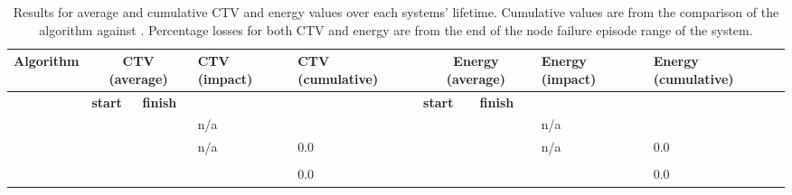 \begin{table}[ht]
	\centering
\begin{tabular}{
			|p{}|p{0.05\textwidth}|p{}|p{}|p{}|p{0.06\textwidth}|p{}|p{0.10\textwidth}|p{}|
		}
\hline
\textbf{Algorithm}
	& \multicolumn{2}{c|}{\textbf{CTV \newline (average)}}
	& \textbf{CTV \newline(impact)}
	& \textbf{CTV \newline(cumulative)}
	& \multicolumn{2}{c|}{\textbf{Energy \newline (average)}}
	& \textbf{Energy \newline (impact)}
	& \textbf{Energy  \newline(cumulative)} \\
\hline & \textbf{start} & \textbf{finish }& & & \textbf{start} & \textbf{finish} & &  \\
\hline
		\algorithmBalancedSimple{}{}
			& \resultsSimpleCTVBalancedStart{}{} &  \resultsSimpleCTVBalancedEnd{}{} 
			& n/a
			& \resultsSimpleCumulativeCTVComparison{}{}
			& \resultsSimpleEnergyBalancedStart{}{} &  \resultsSimpleEnergyBalancedEnd{}{}
			& n/a
			& \resultsSimpleCumulativeEnergyComparison{}{} \\
		\algorithmQRoutingSimple{}{} 
			& \resultsSimpleCTVQRoutingStart{}{} &  \resultsSimpleCTVQRoutingEnd{}{} 
			& n/a
			& $0.0$
			& \resultsSimpleEnergyQRoutingStart{}{} &  \resultsSimpleEnergyQRoutingEnd{}{}
			& n/a
			& $0.0$ \\
			
		\algorithmFailure{}{} 
		& \resultsNodeFailureCTVBalancedStart{}{}  &  \resultsNodeFailureCTVBalancedEnd{}{} 
		& \resultsNodeFailureCTVBalancedImpactDiff{}{}
		& \resultsNodeFailureCumulativeCTVComparison{}{}
		& \resultsNodeFailureEnergyBalancedStart{}{} &  \resultsNodeFailureEnergyBalancedEnd{}{}
		& \resultsNodeFailureEnergyBalancedImpactDiff{}{} 
		& \resultsNodeFailureCumulativeEnergyComparison{}{} \\
		\algorithmQRoutingFailure{}{} 
		& \resultsNodeFailureCTVQRoutingStart{}{} &  \resultsNodeFailureCTVQRoutingEnd{}{} 
		& \resultsNodeFailureCTVQRoutingImpactDiff{}{}
		& $0.0$
		& \resultsNodeFailureEnergyQRoutingEnd{}{}  &   \resultsNodeFailureEnergyQRoutingEnd{}{}
		& \resultsNodeFailureEnergyQRoutingImpactDiff{}{}
		& $0.0$ \\
\hline
\end{tabular}
\captionsetup{labelfont=bf,singlelinecheck=on,justification=raggedright}
\caption{Results for average and cumulative CTV and energy values over each systems' lifetime. Cumulative values are from the comparison of the \acronymWSNOptimisation{}{} algorithm against \acronymQRouting{}{}. Percentage losses for both CTV and energy are from the end of the node failure episode range of the \simulationNodeFailure{}{} system.}
\label{table:results_main}
\end{table}

